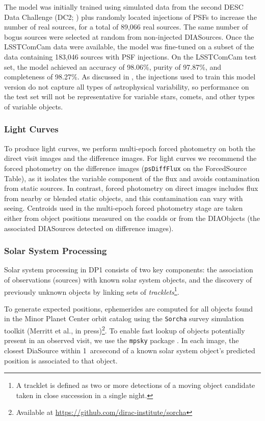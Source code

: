 The model was initially trained using simulated data from the second DESC Data Challenge (DC2; \citep{2021ApJS..253...31L}) plus randomly located injections of PSFs to increase the number of real sources, for a total of 89,066 real sources.
The same number of bogus sources were selected at random from non-injected DIASources.
Once the  \gls{LSSTComCam} data were available, the model was fine-tuned on a subset of the data containing 183,046 sources with PSF injections.
On the \gls{LSSTComCam} test set, the model achieved an accuracy of 98.06\%, purity of 97.87\%, and completeness of 98.27\%.
As discussed in , the injections used to train this model version do not capture all types of astrophysical variability, so performance on the test set will not be representative for variable stars, comets, and other types of variable objects. 

\subsubsection{Light Curves}
\label{sssec:lightcurves}
To produce light curves, we perform multi-epoch \gls{forced photometry} on both the direct visit images and the difference images.
For light curves we recommend the \gls{forced photometry} on the difference images (\texttt{psDiffFlux} on the ForcedSource Table), as it isolates the variable component of the flux and avoids contamination from static sources.
In contrast, \gls{forced photometry} on direct images includes flux from nearby or blended static objects, and this contamination can vary with seeing.
Centroids used in the multi-epoch \gls{forced photometry} stage are taken either from object positions measured on the coadds or from the DIAObjects (the associated DIASources detected on difference images).

\subsubsection{Solar System Processing}
\label{sec:drp:solsys}

Solar system processing in \gls{DP1} consists of two key components: the association of observations (sources) with known solar system objects, and the discovery of previously unknown objects by linking sets of 
{\em tracklets}\footnote{A tracklet is defined as two or more detections of a moving object candidate taken in close succession in a single night.}.

To generate expected positions, ephemerides are computed for all objects found in the Minor Planet \gls{Center} orbit catalog using the \texttt{Sorcha} survey simulation toolkit (Merritt et al., in press)\footnote{Available at \url{https://github.com/dirac-institute/sorcha}}.
To enable fast lookup of objects potentially present in an observed visit, we use the {\tt mpsky} package \citep{mpsky}.
In each image, the closest DiaSource within 1~arcsecond of a known solar system object's predicted position is associated to that object.

